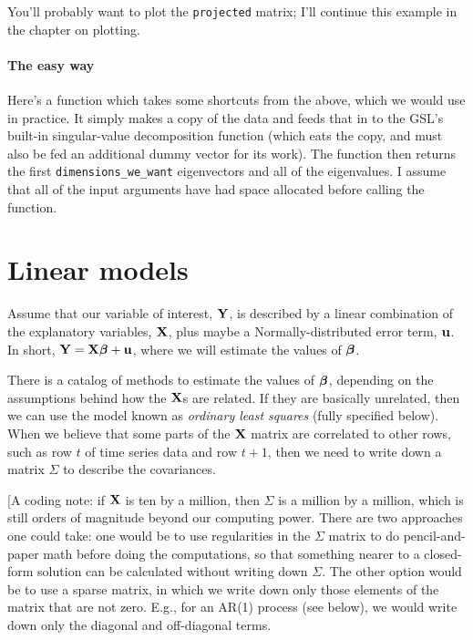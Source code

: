 You'll probably want to plot the {\tt projected} matrix; I'll continue this example in the chapter on
plotting.

\paragraph{The easy way}

Here's a function which takes some shortcuts from the above, which we would use in practice. It simply
makes a copy of the data and feeds that in to the GSL's built-in singular-value decomposition function
(which eats the copy, and must also be fed an additional dummy vector for its work). The function then
returns the first {\tt dimensions\_we\_want} eigenvectors and all of the eigenvalues. I assume that all of
the input arguments have had space allocated before calling the function.




\section{Linear models}
\label{cat}

Assume that our variable of interest, ${\bf Y}$, is
described by a linear combination of the explanatory variables, ${\bf X}$,
plus maybe a Normally-distributed error term, ${\bf u}$. In short,
${\bf Y}={\bf X}{\mbox{\boldmath$\beta$}} + {\bf u}$, where we will estimate the values of ${\mbox{\boldmath$\beta$}}$. 

There is a catalog of methods to estimate the values of ${\mbox{\boldmath$\beta$}}$,
depending on the assumptions behind how the ${\bf X}$s are related. If they
are basically unrelated, then we can use the model known as {\em ordinary
least squares} (fully specified below). When we believe that some parts
of the ${\bf X}$ matrix are correlated to other rows, such as row $t$ of 
time series data and row $t+1$, then we need to write down a matrix
$\Sigma$ to describe the covariances.

[A coding note: if ${\bf X}$ is ten by a million, then $\Sigma$ is a million
by a million, which is still orders of magnitude beyond our computing
power. There are two approaches one could take: one would be to use
regularities in the $\Sigma$ matrix to do pencil-and-paper math before
doing the computations, so that something nearer to a closed-form
solution can be calculated without writing down $\Sigma$. The other
option would be to use a sparse matrix, in which
we write down only those elements of the matrix that are not zero. E.g.,
for an AR(1) process (see below), we would write down only the diagonal and
off-diagonal terms.

